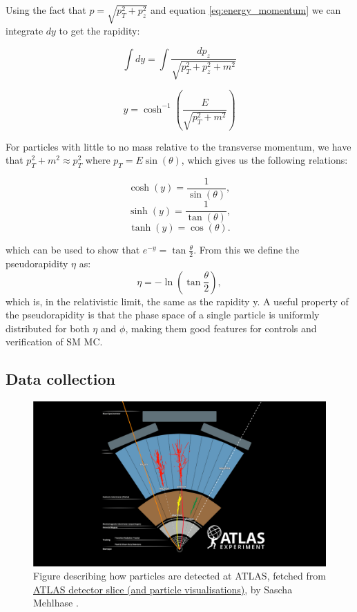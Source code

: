 Using the fact that $p = \sqrt{p_T^2 + p_z^2}$ and equation \ref{eq:energy_momentum} we can integrate $dy$ to get the rapidity:

\begin{equation*}
    \int dy = \int \frac{dp_z}{\sqrt{p_T^2 + p_z^2 + m^2}}
\end{equation*}

\begin{equation}
    y = \cosh^{-1}\left( \frac{E}{\sqrt{p_T^2 + m^2}}\right)
\end{equation}

For particles with little to no mass relative to the transverse momentum, we have that $p_T^2 + m^2 \approx p_T^2$ 
where $p_T = E\sin{(\theta)}$, which gives us the following relations:

\begin{equation*}
    \cosh(y) = \frac{1}{\sin(\theta)},
\end{equation*}
\begin{equation*}
    \sinh(y) = \frac{1}{\tan(\theta)},
\end{equation*}
\begin{equation*}
    \tanh(y) = \cos(\theta).
\end{equation*}

which can be used to show that $e^{-y} = \tan{\frac{\theta}{2}}$. From this we define the pseudorapidity $\eta$ as:
\begin{equation}
    \eta = -\ln{\left( \tan{\frac{\theta}{2}}\right)},
\end{equation}
which is, in the relativistic limit, the same as the rapidity y. A useful property of the pseudorapidity is that 
the phase space of a single particle is uniformly distributed for both $\eta$ and $\phi$, making them good features 
for controls and verification of SM MC. 
\subsection*{Data collection}

\begin{figure}[h!]
    \includegraphics[width=\linewidth]{Figures/atlas/ATLAS Detector Schematic black particles.png}
    \caption[Detector tracking of particles]{Figure describing how particles are detected at ATLAS, fetched from \href{https://cds.cern.ch/record/2770815}{	ATLAS detector slice (and particle visualisations)}, by Sascha Mehlhase \cite{Mehlhase:2770815} . }
    \label{fig:atlas_particle_detect}
\end{figure}


